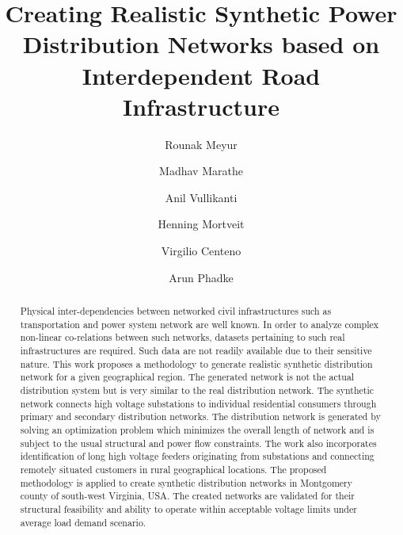 \documentclass[sigconf]{acmart}
\begin{document}
\title{Creating Realistic Synthetic Power Distribution Networks based on Interdependent Road Infrastructure}

\author{Rounak Meyur}

\author{Madhav Marathe}
\author{Anil Vullikanti}
\author{Henning Mortveit}

\author{Virgilio Centeno}
\author{Arun Phadke}

\renewcommand{\shortauthors}{Meyur, et al.}

\begin{abstract}
Physical inter-dependencies between networked civil infrastructures such as transportation and power system network are well known. In order to analyze complex non-linear co-relations between such networks, datasets pertaining to such real infrastructures are required. Such data are not readily available due to their sensitive nature. This work proposes a methodology to generate realistic synthetic distribution network for a given geographical region. The generated network is not the actual distribution system but is very similar to the real distribution network. The synthetic network connects high voltage substations to individual residential consumers through primary and secondary distribution networks. The distribution network is generated by solving an optimization problem which minimizes the overall length of network and is subject to the usual structural and power flow constraints. The work also incorporates identification of long high voltage feeders originating from substations and connecting remotely situated customers in rural geographical locations. The proposed methodology is applied to create synthetic distribution networks in Montgomery county of south-west Virginia, USA. The created networks are validated for their structural feasibility and ability to operate within acceptable voltage limits under average load demand scenario.
\end{abstract}
\end{document}
